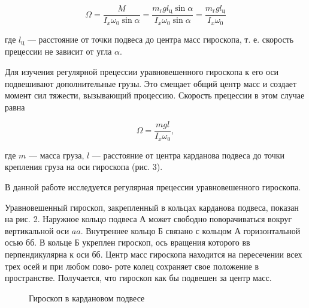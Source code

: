 \documentclass[14pt]{article}
\begin{document}
\begin{equation}
\Omega = \frac{M}{I_x\omega_0\sin\alpha} = \frac{m_{\text{г}}gl_{\text{ц}}\sin\alpha}{I_x\omega_0\sin\alpha} = \frac{m_{\text{г}}gl_{\text{ц}}}{I_x\omega_0}
\end{equation}

\noindent где $l_{\text{ц}}$ --- расстояние от точки подвеса до центра масс гироскопа, т. е. скорость прецессии не зависит от угла $\alpha$. 

Для изучения регулярной прецессии уравновешенного гироскопа к его оси подвешивают дополнительные грузы. Это смещает общий центр масс и создает момент сил тяжести, вызывающий процессию. Скорость прецессии в этом случае равна

\begin{equation}
\Omega = \frac{mgl}{I_x\omega_0},
\end{equation}

\noindent где $m$ --- масса груза, $l$ --- расстояние от центра карданова подвеса до точки крепления груза на оси гироскопа (рис. 3).

В данной работе исследуется регулярная прецессии уравновешенного гироскопа.

Уравновешенный гироскоп, закрепленный в кольцах карданова подвеса, показан на рис. 2. Наружное кольцо подвеса А может свободно поворачиваться вокруг вертикальной оси $aa$. Внутреннее кольцо Б связано с кольцом А горизонтальной осью $\text{бб}$. В кольце Б укреплен гироскоп, ось вращения которого $\text{вв}$ перпендикулярна к оси $\text{бб}$. Центр масс гироскопа находится на пересечении всех трех осей и при любом пово-
роте колец сохраняет свое положение в пространстве. Получается, что гироскоп как бы подвешен за центр масс.

\begin{figure}[h!]
	\caption{Гироскоп в кардановом подвесе}
	\label{fig:image}
\end{figure} 
\end{document}

